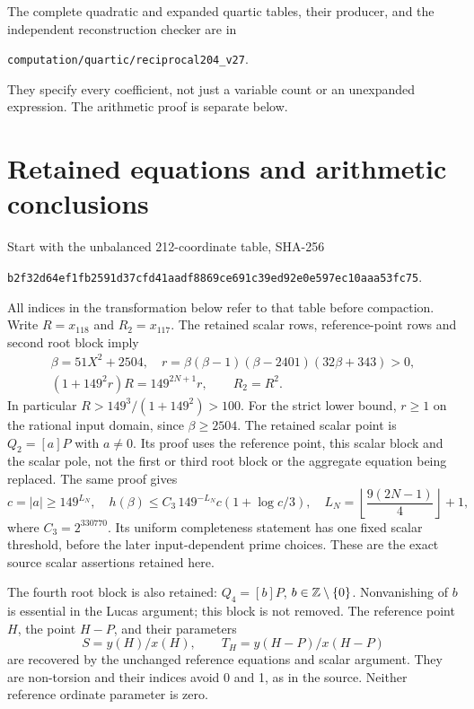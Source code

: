 \documentclass[11pt,a4paper]{article}
\begin{document}
The complete quadratic and expanded quartic tables, their producer,
and the independent reconstruction checker are in
\begin{center}\small
\nolinkurl{computation/quartic/reciprocal204_v27}.
\end{center}
They specify every coefficient, not just a variable count or an
unexpanded expression. The arithmetic proof is separate below.

\section{Retained equations and arithmetic conclusions}
Start with the unbalanced 212-coordinate table, SHA-256
\begin{center}\small
\texttt{b2f32d64ef1fb2591d37cfd41aadf8869ce691c39ed92e0e597ec10aaa53fc75}.
\end{center}
All indices in the transformation below refer to that table before
compaction. Write $R=x_{118}$ and $R_2=x_{117}$. The retained scalar
rows, reference-point rows and second root block imply
\begin{equation}\label{eq:scalar-identities}
 \begin{gathered}
 \beta=51X^2+2504,\quad
 r=\beta(\beta-1)(\beta-2401)(32\beta+343)>0,\\
 (1+149^2r)R=149^{2N+1}r,\qquad R_2=R^2.
 \end{gathered}
\end{equation}
In particular $R>149^3/(1+149^2)>100$. For the strict lower bound,
$r\ge1$ on the rational input domain, since $\beta\ge2504$.
The retained scalar point is $Q_2=[a]P$ with $a\ne0$. Its proof uses
the reference point, this scalar block and the scalar pole, not the
first or third root block or the aggregate equation being replaced.
The same proof gives
\begin{equation}\label{eq:scalar-bound}
 c=|a|\ge149^{L_N},\quad
 h(\beta)\le C_3\,149^{-L_N}c(1+\log c/3),\quad
 L_N=\left\lfloor\frac{9(2N-1)}4\right\rfloor+1,
\end{equation}
where $C_3=2^{330770}$. Its uniform completeness statement has one
fixed scalar threshold, before the later input-dependent prime choices.
These are the exact source scalar assertions retained here.

The fourth root block is also retained: $Q_4=[b]P$, $b\in\mathbb Z\setminus\{0\}$.
Nonvanishing of $b$ is essential in the Lucas argument; this block is
not removed. The reference point $H$, the point $H-P$, and their
parameters
\[
 S=y(H)/x(H),\qquad T_H=y(H-P)/x(H-P)
\]
are recovered by the unchanged reference equations and scalar argument.
They are non-torsion and their indices avoid 0 and 1, as in the source.
Neither reference ordinate parameter is zero.
\end{document}
